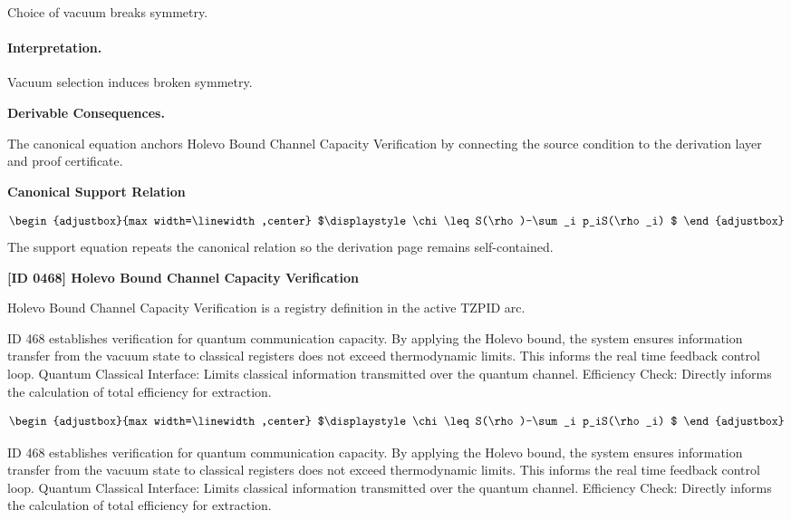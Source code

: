 Choice of vacuum breaks symmetry.

\paragraph{Interpretation.}
Vacuum selection induces broken symmetry.

\par\vspace{0.35em}
\noindent\textbf{Derivable Consequences.}\quad
\begingroup
\footnotesize
\raggedright
The canonical equation anchors Holevo Bound Channel Capacity Verification by connecting the source condition to the derivation layer and proof certificate.
\par\endgroup

\noindent\textbf{Canonical Support Relation}\par
\[
\begin{adjustbox}{max width=\linewidth,center}
$\displaystyle
\chi\leq S(\rho)-\sum_i p_iS(\rho_i)
$
\end{adjustbox}
\]
\noindent The support equation repeats the canonical relation so the derivation page remains self-contained.\par

\clearpage
\noindent\textbf{[ID 0468] Holevo Bound Channel Capacity Verification}\par
\vspace{0.35em}
\begingroup\small
{}
Holevo Bound Channel Capacity Verification is a registry definition in the active TZPID arc.

ID 468 establishes verification for quantum communication capacity. By applying the Holevo bound, the system ensures information transfer from the vacuum state to classical registers does not exceed thermodynamic limits. This informs the real time feedback control loop. Quantum Classical Interface: Limits classical information transmitted over the quantum channel. Efficiency Check: Directly informs the calculation of total efficiency for extraction.

\[
\begin{adjustbox}{max width=\linewidth,center}
$\displaystyle
\chi\leq S(\rho)-\sum_i p_iS(\rho_i)
$
\end{adjustbox}
\]

ID 468 establishes verification for quantum communication capacity. By applying the Holevo bound, the system ensures information transfer from the vacuum state to classical registers does not exceed thermodynamic limits. This informs the real time feedback control loop. Quantum Classical Interface: Limits classical information transmitted over the quantum channel. Efficiency Check: Directly informs the calculation of total efficiency for extraction.

